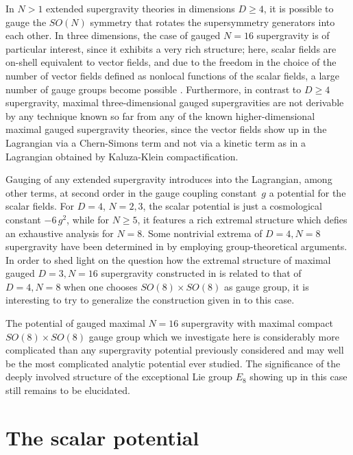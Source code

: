 \documentclass[a4paper,12pt]{article}
\begin{document}
In $N>1$ extended supergravity theories in dimensions $D\ge4$, it is
possible to gauge the $SO(N)$ symmetry that rotates the supersymmetry
generators into each other. In three dimensions, the case of gauged
$N=16$ supergravity is of particular interest, since it exhibits a
very rich structure; here, scalar fields are on-shell equivalent to
vector fields, and due to the freedom in the choice of the number of
vector fields defined as nonlocal functions of the scalar fields, a
large number of gauge groups become possible
\cite{Nicolai:2000sc, Nicolai:2001sv}. Furthermore, in contrast to
$D\ge4$ supergravity, maximal three-dimensional gauged supergravities
are not derivable by any technique known so far from any of the known
higher-dimensional maximal gauged supergravity theories, since the
vector fields show up in the Lagrangian via a Chern-Simons term and
not via a kinetic term as in a Lagrangian obtained by Kaluza-Klein
compactification.

Gauging of any extended supergravity introduces into the Lagrangian,
among other terms, at second order in the gauge coupling constant~$g$
a potential for the scalar fields. For $D=4$, $N=2,3$, the scalar
potential is just a cosmological constant $-6\,g^2$, while for $N\ge
5$, it features a rich extremal structure which defies
an exhaustive analysis for $N=8$. Some nontrivial extrema of $D=4, N=8$
supergravity have been determined in
\cite{Warner:du, Warner:vz} by employing group-theoretical arguments.
In order to shed light on the question how the extremal structure of
maximal gauged $D=3, N=16$ supergravity constructed in
\cite{Nicolai:2000sc, Nicolai:2001sv} is related to that of $D=4, N=8$
when one chooses $SO(8)\times SO(8)$ as gauge group, it is interesting
to try to generalize the construction given in \cite{Warner:vz} to
this case.

The potential of gauged maximal $N=16$ supergravity with maximal
compact $SO(8)\times SO(8)$ gauge group which we investigate here is
considerably more complicated than any supergravity potential
previously considered and may well be the most complicated analytic
potential ever studied. The significance of the deeply involved
structure of the exceptional Lie group $E_8$ showing up in this case
still remains to be elucidated.

\section{The scalar potential}
\end{document}
